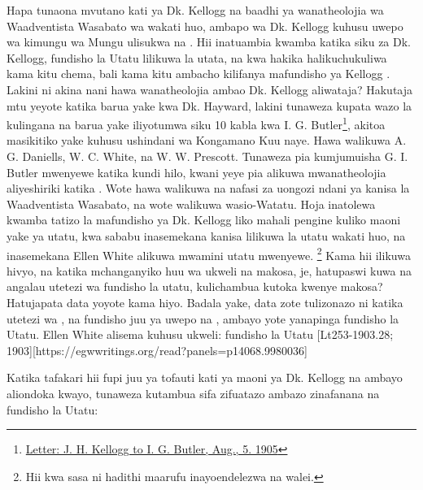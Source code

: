 Hapa tunaona mvutano kati ya Dk. Kellogg na baadhi ya wanatheolojia wa Waadventista Wasabato wa wakati huo, ambapo  wa Dk. Kellogg kuhusu uwepo wa kimungu wa Mungu ulisukwa na . Hii inatuambia kwamba katika siku za Dk. Kellogg, fundisho la Utatu lilikuwa la utata, na kwa hakika halikuchukuliwa kama kitu chema, bali kama kitu ambacho kilifanya mafundisho ya Kellogg . Lakini ni akina nani hawa wanatheolojia ambao Dk. Kellogg aliwataja? Hakutaja mtu yeyote katika barua yake kwa Dk. Hayward, lakini tunaweza kupata wazo la  kulingana na barua yake iliyotumwa siku 10 kabla kwa I. G. Butler\footnote{\href{https://forgotten-pillar.s3.us-east-2.amazonaws.com/1905-08-05-kellogg-butler.pdf}{Letter: J. H. Kellogg to I. G. Butler, Aug., 5. 1905}}, akitoa masikitiko yake kuhusu ushindani wa Kongamano Kuu naye. Hawa walikuwa A. G. Daniells, W. C. White, na W. W. Prescott. Tunaweza pia kumjumuisha G. I. Butler mwenyewe katika kundi hilo, kwani yeye pia alikuwa mwanatheolojia aliyeshiriki katika . Wote hawa walikuwa na nafasi za uongozi ndani ya kanisa la Waadventista Wasabato, na wote walikuwa wasio-Watatu. Hoja inatolewa kwamba tatizo la mafundisho ya Dk. Kellogg liko mahali pengine kuliko maoni yake ya utatu, kwa sababu inasemekana kanisa lilikuwa la utatu wakati huo, na inasemekana Ellen White alikuwa mwamini utatu mwenyewe. \footnote{Hii kwa sasa ni hadithi maarufu inayoendelezwa na walei.} Kama hii ilikuwa hivyo, na katika mchanganyiko huu wa ukweli na makosa, je, hatupaswi kuwa na angalau utetezi wa fundisho la utatu, kulichambua kutoka kwenye makosa? Hatujapata data yoyote kama hiyo. Badala yake, data zote tulizonazo ni katika utetezi wa , na fundisho juu ya uwepo na , ambayo yote yanapinga fundisho la Utatu. Ellen White alisema kuhusu ukweli: fundisho la Utatu [Lt253-1903.28; 1903][https://egwwritings.org/read?panels=p14068.9980036]


Katika tafakari hii fupi juu ya tofauti kati ya maoni ya Dk. Kellogg na  ambayo aliondoka kwayo, tunaweza kutambua sifa zifuatazo ambazo zinafanana na fundisho la Utatu:


